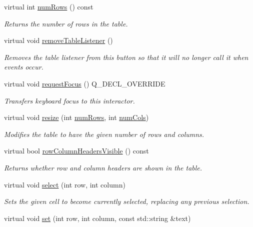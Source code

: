 \begin{DoxyCompactItemize}
virtual int \mbox{\hyperlink{classGTable_a00b7e69dd5c43e42cc91db26c459ad8b}{num\+Rows}} () const
\begin{DoxyCompactList}\small\item\em Returns the number of rows in the table. \end{DoxyCompactList}\item 
virtual void \mbox{\hyperlink{classGTable_a5c18bacaf370f9c3da545f5c6e6e9515}{remove\+Table\+Listener}} ()
\begin{DoxyCompactList}\small\item\em Removes the table listener from this button so that it will no longer call it when events occur. \end{DoxyCompactList}\item 
virtual void \mbox{\hyperlink{classGTable_a49b39e0eeaf5af829e8956e9055c5cdc}{request\+Focus}} () Q\+\_\+\+D\+E\+C\+L\+\_\+\+O\+V\+E\+R\+R\+I\+DE
\begin{DoxyCompactList}\small\item\em Transfers keyboard focus to this interactor. \end{DoxyCompactList}\item 
virtual void \mbox{\hyperlink{classGTable_a600810b1a74ec9a062ce38666a9e7602}{resize}} (int \mbox{\hyperlink{classGTable_a00b7e69dd5c43e42cc91db26c459ad8b}{num\+Rows}}, int \mbox{\hyperlink{classGTable_a5997e103e56aae1db12e1f7f02e136c5}{num\+Cols}})
\begin{DoxyCompactList}\small\item\em Modifies the table to have the given number of rows and columns. \end{DoxyCompactList}\item 
virtual bool \mbox{\hyperlink{classGTable_a92c3dff0296ec16823a1172a9f9f07e6}{row\+Column\+Headers\+Visible}} () const
\begin{DoxyCompactList}\small\item\em Returns whether row and column headers are shown in the table. \end{DoxyCompactList}\item 
virtual void \mbox{\hyperlink{classGTable_ab06a36d6ed149c8477a1a9d32be2ba43}{select}} (int row, int column)
\begin{DoxyCompactList}\small\item\em Sets the given cell to become currently selected, replacing any previous selection. \end{DoxyCompactList}\item 
virtual void \mbox{\hyperlink{classGTable_ad1a09eece3a11ef4d2c56a951ae06a69}{set}} (int row, int column, const std\+::string \&text)

\end{DoxyCompactItemize}

